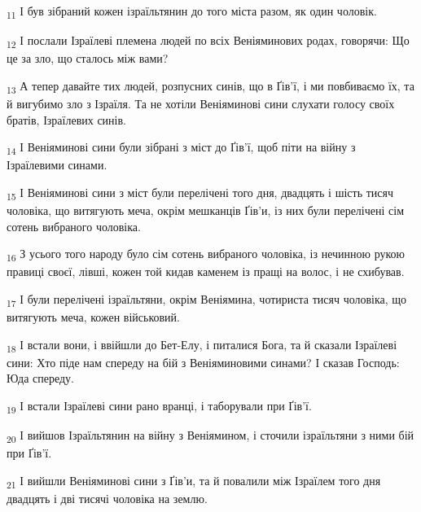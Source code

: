 \begin{tcolorbox}
\textsubscript{11} І був зібраний кожен ізраїльтянин до того міста разом, як один чоловік.
\end{tcolorbox}
\begin{tcolorbox}
\textsubscript{12} І послали Ізраїлеві племена людей по всіх Веніяминових родах, говорячи: Що це за зло, що сталось між вами?
\end{tcolorbox}
\begin{tcolorbox}
\textsubscript{13} А тепер давайте тих людей, розпусних синів, що в Ґів'ї, і ми повбиваємо їх, та й вигубимо зло з Ізраїля. Та не хотіли Веніяминові сини слухати голосу своїх братів, Ізраїлевих синів.
\end{tcolorbox}
\begin{tcolorbox}
\textsubscript{14} І Веніяминові сини були зібрані з міст до Ґів'ї, щоб піти на війну з Ізраїлевими синами.
\end{tcolorbox}
\begin{tcolorbox}
\textsubscript{15} І Веніяминові сини з міст були перелічені того дня, двадцять і шість тисяч чоловіка, що витягують меча, окрім мешканців Ґів'и, із них були перелічені сім сотень вибраного чоловіка.
\end{tcolorbox}
\begin{tcolorbox}
\textsubscript{16} З усього того народу було сім сотень вибраного чоловіка, із нечинною рукою правиці своєї, лівші, кожен той кидав каменем із пращі на волос, і не схибував.
\end{tcolorbox}
\begin{tcolorbox}
\textsubscript{17} І були перелічені ізраїльтяни, окрім Веніямина, чотириста тисяч чоловіка, що витягують меча, кожен військовий.
\end{tcolorbox}
\begin{tcolorbox}
\textsubscript{18} І встали вони, і ввійшли до Бет-Елу, і питалися Бога, та й сказали Ізраїлеві сини: Хто піде нам спереду на бій з Веніяминовими синами? І сказав Господь: Юда спереду.
\end{tcolorbox}
\begin{tcolorbox}
\textsubscript{19} І встали Ізраїлеві сини рано вранці, і таборували при Ґів'ї.
\end{tcolorbox}
\begin{tcolorbox}
\textsubscript{20} І вийшов Ізраїльтянин на війну з Веніямином, і сточили ізраїльтяни з ними бій при Ґів'ї.
\end{tcolorbox}
\begin{tcolorbox}
\textsubscript{21} І вийшли Веніяминові сини з Ґів'и, та й повалили між Ізраїлем того дня двадцять і дві тисячі чоловіка на землю.
\end{tcolorbox}
